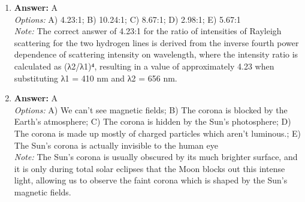 \documentclass[12pt]{article}
\begin{document}
\begin{enumerate}[label=\arabic*.]
\item \textbf{Answer:} A
\\ \textit{Options:} A) 4.23:1; B) 10.24:1; C) 8.67:1; D) 2.98:1; E) 5.67:1
\\ \textit{Note:} The correct answer of 4.23:1 for the ratio of intensities of Rayleigh scattering for the two hydrogen lines is derived from the inverse fourth power dependence of scattering intensity on wavelength, where the intensity ratio is calculated as (λ2/λ1)⁴, resulting in a value of approximately 4.23 when substituting λ1 = 410 nm and λ2 = 656 nm.
\item \textbf{Answer:} A
\\ \textit{Options:} A) We can't see magnetic fields; B) The corona is blocked by the Earth's atmosphere; C) The corona is hidden by the Sun's photosphere; D) The corona is made up mostly of charged particles which aren't luminous.; E) The Sun's corona is actually invisible to the human eye
\\ \textit{Note:} The Sun's corona is usually obscured by its much brighter surface, and it is only during total solar eclipses that the Moon blocks out this intense light, allowing us to observe the faint corona which is shaped by the Sun's magnetic fields.
\end{enumerate}
\end{document}
